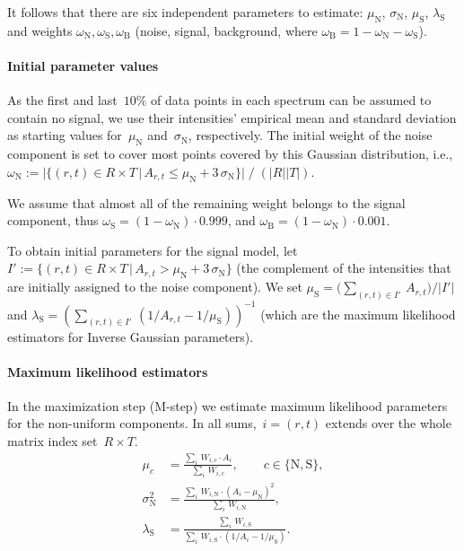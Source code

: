 \documentclass{article}
\newcommand{\given}{\,|\,}
\begin{document}
It follows that there are six independent parameters to estimate: $\mu_{\text{N}}$, $\sigma_{\text{N}}$, $\mu_{\text{S}}$, $\lambda_{\text{S}}$ and weights $\omega_{\text{N}}, \omega_{\text{S}},\omega_{\text{B}}$ (noise, signal, background, where $\omega_{\text{B}} = 1 - \omega_{\text{N}} - \omega_{\text{S}}$).

\paragraph{Initial parameter values}
As the first and last~$10\%$ of data points in each spectrum can be assumed to contain no signal, we use their intensities' empirical mean and standard deviation as starting values for~$\mu_{\text{N}}$ and~$\sigma_{\text{N}}$, respectively.
The initial weight of the noise component is set to cover most points covered by this Gaussian distribution, i.e., $\omega_{\text{N}} := |\{(r,t) \in R\times T \given A_{r,t} \leq \mu_{\text{N}} + 3\, \sigma_{\text{N}}\}| \; /\; (|R||T|)$.

We assume that almost all of the remaining weight belongs to the signal component, thus $\omega_{\text{S}} = (1 - \omega_{\text{N}}) \cdot 0.999$, and $\omega_{\text{B}} = (1 - \omega_{\text{N}}) \cdot 0.001$. 

To obtain initial parameters for the signal model, let $I' := \{(r,t) \in R\times T \given A_{r,t} > \mu_{\text{N}} + 3 \, \sigma_{\text{N}}\}$ (the complement of the intensities that are initially assigned to the noise component).
We set $\mu_{\text{S}} = \big( \sum_{(r,t) \in I'}\, A_{r,t} \big) / |I'|$ and $\lambda_{\text{S}} = (\sum_{(r,t) \in I'}\, (1/A_{r,t} - 1 / \mu_{\text{S}}))^{-1}$ (which are the maximum likelihood estimators for Inverse Gaussian parameters).

\paragraph*{Maximum likelihood estimators}
In the maximization step (M-step) we estimate maximum likelihood parameters for the non-uniform components.
In all sums,~$i=(r,t)$ extends over the whole matrix index set~$R\times T$.
\begin{align}
\mu_{c} &= \frac{\sum_{i}\, W_{i, c} \cdot A_i}{\sum_{i}\, W_{i, c}},  \qquad c\in\{\text{N},\text{S}\},
\label{equ:mstepmueDN} \\
\sigma^2_{\text{N}} &= \frac{ \sum_{i}\, W_{i, \text{N}} \cdot (A_i - \mu_{\text{N}})^2 }{ \sum_{i}\, W_{i, \text{N}} }, \label{equ:mstepsigmaDN} \\
\lambda_{\text{S}} &= \frac{ \sum_{i}\, W_{i, \text{S}} }{ \sum_{i}\, W_{i, \text{S}} \cdot (1 / A_i - 1 / \mu_{\text{S}}) }. \label{equ:msteplambdaDN}
\end{align}
\end{document}

